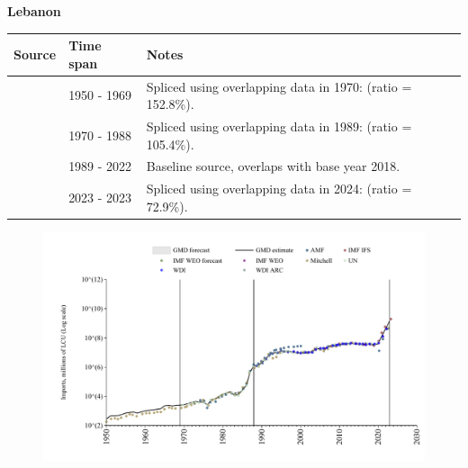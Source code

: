 \documentclass[12pt,a4paper,landscape]{article}
\begin{document}
\begin{adjustbox}{max totalsize={\paperwidth}{\paperheight},center}
\begin{minipage}[t][\textheight][t]{\textwidth}
\vspace*{0.5cm}
{}
\begin{center}
{\Large\bfseries Lebanon}
\end{center}
\vspace{0.5cm}
\begin{table}[H]
\centering
\small
\begin{tabular}{|l|l|l|}
\hline
\textbf{Source} & \textbf{Time span} & \textbf{Notes} \\
\hline
\rowcolor{white}\cite{Mitchell}& 1950 - 1969 &Spliced using overlapping data in 1970: (ratio = 152.8\%).\\
\rowcolor{lightgray}\cite{UN}& 1970 - 1988 &Spliced using overlapping data in 1989: (ratio = 105.4\%).\\
\rowcolor{white}\cite{WDI}& 1989 - 2022 &Baseline source, overlaps with base year 2018.\\
\rowcolor{lightgray}\cite{IMF_IFS}& 2023 - 2023 &Spliced using overlapping data in 2024: (ratio = 72.9\%).\\
\hline
\end{tabular}
\end{table}
\begin{figure}[H]
\centering
\includegraphics[width=\textwidth,height=0.6\textheight,keepaspectratio]{graphs/LBN_imports.pdf}
\end{figure}
\end{minipage}
\end{adjustbox}
\end{document}

